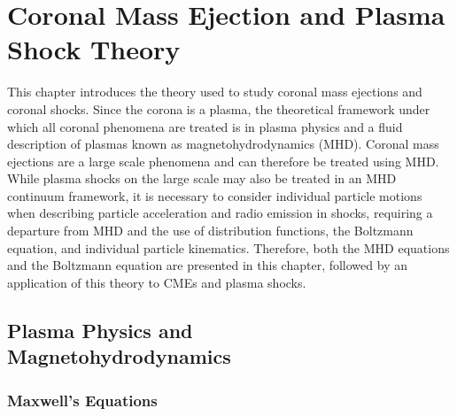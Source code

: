 \singlespacing
\chapter{Coronal Mass Ejection and Plasma Shock Theory} 
\label{chap:2}
\doublespacing
This chapter introduces the theory used to study coronal mass ejections and coronal shocks. Since the corona is a plasma, the theoretical framework under which all coronal phenomena are treated is in plasma physics and a fluid description of plasmas known as magnetohydrodynamics (MHD). Coronal mass ejections are a large scale phenomena and can therefore be treated using MHD. While plasma shocks on the large scale may also be treated in an MHD continuum framework, it is necessary to consider individual particle motions when describing particle acceleration and radio emission in shocks, requiring a departure from MHD and the use of distribution functions, the Boltzmann equation, and individual particle kinematics. Therefore, both the MHD equations and the Boltzmann equation are presented in this chapter, followed by an application of this theory to CMEs and plasma shocks.

\singlespacing
\section{Plasma Physics and  \\ Magnetohydrodynamics}\label{sec:1}
\doublespacing
\subsection{Maxwell's Equations}\label{sec:10}

